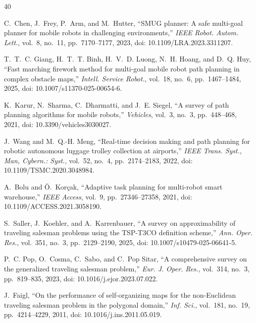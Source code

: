 \documentclass[lettersize,journal]{IEEEtran}
\begin{document}
\begin{thebibliography}{40}

C.~Chen, J.~Frey, P.~Arm, and M.~Hutter, ``SMUG planner: A safe multi-goal planner for mobile robots in challenging environments,'' \textit{IEEE Robot. Autom. Lett.}, vol.~8, no.~11, pp.~7170--7177, 2023, doi: 10.1109/LRA.2023.3311207.



T.~T.~C. Giang, H.~T.~T. Binh, H.~V.~D. Luong, N.~H. Hoang, and D.~Q. Huy, ``Fast marching firework method for multi-goal mobile robot path planning in complex obstacle maps,'' \textit{Intell. Service Robot.}, vol.~18, no.~6, pp.~1467--1484, 2025, doi: 10.1007/s11370-025-00654-6.



K.~Karur, N.~Sharma, C.~Dharmatti, and J.~E. Siegel, ``A survey of path planning algorithms for mobile robots,'' \textit{Vehicles}, vol.~3, no.~3, pp.~448--468, 2021, doi: 10.3390/vehicles3030027.



J.~Wang and M.~Q.-H. Meng, ``Real-time decision making and path planning for robotic autonomous luggage trolley collection at airports,'' \textit{IEEE Trans. Syst., Man, Cybern.: Syst.}, vol.~52, no.~4, pp.~2174--2183, 2022, doi: 10.1109/TSMC.2020.3048984.



A.~Bolu and \"O.~Kor\c{c}ak, ``Adaptive task planning for multi-robot smart warehouse,'' \textit{IEEE Access}, vol.~9, pp.~27346--27358, 2021, doi: 10.1109/ACCESS.2021.3058190.



S.~Saller, J.~Koehler, and A.~Karrenbauer, ``A survey on approximability of traveling salesman problems using the TSP-T3CO definition scheme,'' \textit{Ann. Oper. Res.}, vol.~351, no.~3, pp.~2129--2190, 2025, doi: 10.1007/s10479-025-06641-5.



P.~C. Pop, O.~Cosma, C.~Sabo, and C.~Pop Sitar, ``A comprehensive survey on the generalized traveling salesman problem,'' \textit{Eur. J. Oper. Res.}, vol.~314, no.~3, pp.~819--835, 2023, doi: 10.1016/j.ejor.2023.07.022.



J.~Faigl, ``On the performance of self-organizing maps for the non-Euclidean traveling salesman problem in the polygonal domain,'' \textit{Inf. Sci.}, vol.~181, no.~19, pp.~4214--4229, 2011, doi: 10.1016/j.ins.2011.05.019.



\end{thebibliography}
\end{document}
